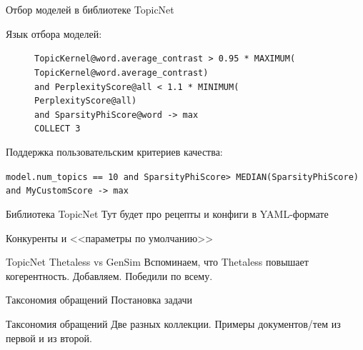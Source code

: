 \begin{frame}{Отбор моделей в библиотеке TopicNet}

Язык отбора моделей:

\begin{figure}[ht]
\raggedright
\texttt{TopicKernel@word.average\_contrast > 0.95 * MAXIMUM( \\
\hphantom{\ \ \ \ \ \ \ \ }TopicKernel@word.average\_contrast) \\
\hphantom{\ \ } and PerplexityScore@all < 1.1 * MINIMUM( \\
\hphantom{\ \ \ \ \ \ \ \ }PerplexityScore@all) \\
\hphantom{\ \ } and SparsityPhiScore@word -> max\\
\hphantom{\ \ } COLLECT 3} \\
\label{DSL-example}
\end{figure} 
	

Поддержка пользовательским критериев качества:

\texttt{model.num\_topics == 10 and SparsityPhiScore\@word > MEDIAN(SparsityPhiScore\@word) and MyCustomScore -> max}

\end{frame}

\begin{frame}{Библиотека TopicNet}
	Тут будет про рецепты и конфиги в YAML-формате
\end{frame}

\begin{frame}{Конкуренты и <<параметры по умолчанию>>}


\end{frame}

\begin{frame}{TopicNet Thetaless vs GenSim}
Вспоминаем, что Thetaless повышает когерентность. Добавляем. Победили по всему.
\end{frame}


\begin{frame}{Таксономия обращений}
	Постановка задачи
\end{frame}

\begin{frame}{Таксономия обращений}
	Две разных коллекции. Примеры документов/тем из первой и из второй.
\end{frame}

